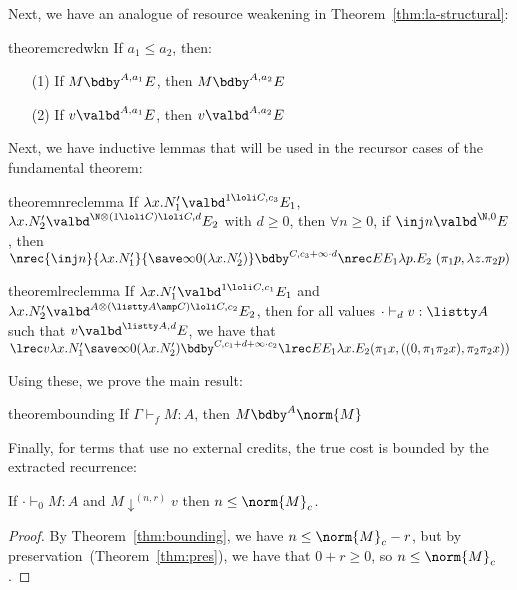 Next, we have an analogue of resource weakening in
Theorem~\ref{thm:la-structural}:

\begin{restatable}{theorem}{credwkn}
If $a_1 \leq a_2$, then:
\begin{enumerate}
  \item[(1)] If $M \bdby^{A,a_1} E$, then $M \bdby^{A,a_2} E$
  \item[(2)] If $v \valbd^{A,a_1} E$, then $v \valbd^{A,a_2} E$ 
\end{enumerate}
\end{restatable}

Next, we have inductive lemmas that will be used in the recursor cases
of the fundamental theorem:

\begin{restatable}[$\N$-Recursor]{theorem}{nreclemma}
\label{thm:nrec-lemma}
If $\lambda x.N_1' \valbd^{1 \loli C,c_3} E_1$, $\lambda x.N_2' \valbd^{\N
\otimes (1 \loli C) \loli C,d} E_2$ with $d \geq 0$, then $\forall n \geq 0$, if $\inj n \valbd^{\N,0} E$, then $\nrec {\inj n} {\lambda x.N_1'} {\save \infty 0 (\lambda x.N_2')} \bdby^{C,c_3 + \infty \cdot d} \nrec E {E_1} {\lambda p. E_2 \; (\pi_1 p, \lambda z.\pi_2 p)}$
\end{restatable}

\begin{restatable}{theorem}{lreclemma}
\label{thm:lrec-lemma}
If $\lambda x.N_1' \valbd^{1 \loli C,c_1} E_1$ and $\lambda x.N_2'
\valbd^{A \otimes (\listty A \amp C) \loli C,c_2} E_2$, then for all
values $\cdot \vdash_d v : \listty A$ such that $v \valbd^{\listty A,d}
E$, we have that\\
$\lrec v {\lambda x.N_1'} {\save \infty 0 {(\lambda x.N_2')}} \bdby^{C,c_1+d + \infty \cdot c_2} \lrec E {E_1} {\lambda x. E_2 (\pi_1 x,((0,\pi_1 \pi_2 x),\pi_2\pi_2 x)) }$
\end{restatable}

Using these, we prove the main result:

\begin{restatable}{theorem}{bounding}
\label{thm:bounding}
If $\Gamma \vdash_f M : A$, then $M \bdby^A \norm{M}$
\end{restatable}

Finally, for terms that use no external credits, the true cost is
bounded by the extracted recurrence: 

\begin{corollary} \label{cor:true-cost}
If $\cdot \vdash_0 M : A$ and $M \downarrow^{(n,r)} v$ then $n \le
\norm{M}_c$.
\end{corollary}
\begin{proof}
By Theorem~\ref{thm:bounding}, we have $n \le \norm{M}_c - r$, but by
preservation~(Theorem~\ref{thm:pres}), we have that $0 + r \ge 0$, so
$n \le \norm{M}_c$.  
\end{proof}

